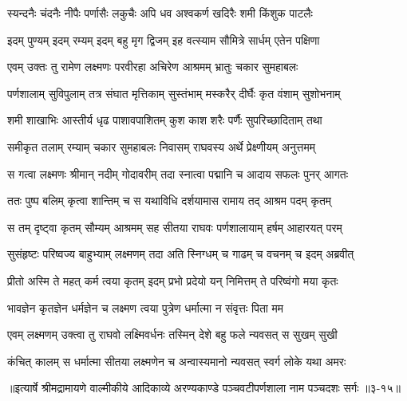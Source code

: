 \twolineshloka
{स्यन्दनैः चंदनैः नीपैः पर्णासैः लकुचैः अपि}
{धव अश्वकर्ण खदिरैः शमी किंशुक पाटलैः} %

\twolineshloka
{इदम् पुण्यम् इदम् रम्यम् इदम् बहु मृग द्विजम्}
{इह वत्स्याम सौमित्रे सार्धम् एतेन पक्षिणा} %

\twolineshloka
{एवम् उक्तः तु रामेण लक्ष्मणः परवीरहा}
{अचिरेण आश्रमम् भ्रातुः चकार सुमहाबलः} %

\twolineshloka
{पर्णशालाम् सुविपुलाम् तत्र संघात मृत्तिकाम्}
{सुस्तंभाम् मस्करैर् दीर्घैः कृत वंशाम् सुशोभनाम्} %

\twolineshloka
{शमी शाखाभिः आस्तीर्य धृढ पाशावपाशितम्}
{कुश काश शरैः पर्णैः सुपरिच्छादिताम् तथा} %

\twolineshloka
{समीकृत तलाम् रम्याम् चकार सुमहाबलः}
{निवासम् राघवस्य अर्थे प्रेक्ष्णीयम् अनुत्तमम्} %

\twolineshloka
{स गत्वा लक्ष्मणः श्रीमान् नदीम् गोदावरीम् तदा}
{स्नात्वा पद्मानि च आदाय सफलः पुनर् आगतः} %

\twolineshloka
{ततः पुष्प बलिम् कृत्वा शान्तिम् च स यथाविधि}
{दर्शयामास रामाय तद् आश्रम पदम् कृतम्} %

\twolineshloka
{स तम् दृष्ट्वा कृतम् सौम्यम् आश्रमम् सह सीतया}
{राघवः पर्णशालायाम् हर्षम् आहारयत् परम्} %

\twolineshloka
{सुसंहृष्टः परिष्वज्य बाहुभ्याम् लक्ष्मणम् तदा}
{अति स्निग्धम् च गाढम् च वचनम् च इदम् अब्रवीत्} %

\twolineshloka
{प्रीतो अस्मि ते महत् कर्म त्वया कृतम् इदम् प्रभो}
{प्रदेयो यन् निमित्तम् ते परिष्वंगो मया कृतः} %

\twolineshloka
{भावज्ञेन कृतज्ञेन धर्मज्ञेन च लक्ष्मण}
{त्वया पुत्रेण धर्मात्मा न संवृत्तः पिता मम} %

\twolineshloka
{एवम् लक्ष्मणम् उक्त्वा तु राघवो लक्ष्मिवर्धनः}
{तस्मिन् देशे बहु फले न्यवसत् स सुखम् सुखी} %

\onelineshloka
{कंचित् कालम् स धर्मात्मा सीतया लक्ष्मणेन च अन्वास्यमानो न्यवसत् स्वर्ग लोके यथा अमरः} %


॥इत्यार्षे श्रीमद्रामायणे वाल्मीकीये आदिकाव्ये अरण्यकाण्डे पञ्चवटीपर्णशाला नाम पञ्चदशः सर्गः ॥३-१५॥
